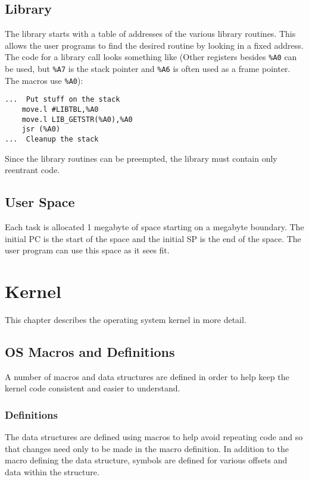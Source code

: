 \documentclass[10pt, openany]{book}
\begin{document}
\section{Library}
The library starts with a table of addresses of the various library routines.  This allows the user programs to find the desired routine by looking in a fixed address.  The code for a library call looks something like (Other registers besides \verb|%A0| can be used, but \verb|%A7| is the stack pointer and \verb|%A6| is often used as a frame pointer.  The macros use \verb|%A0|):
\begin{lstlisting}
...  Put stuff on the stack
    move.l #LIBTBL,%A0
    move.l LIB_GETSTR(%A0),%A0
    jsr (%A0)
...  Cleanup the stack
\end{lstlisting}

Since the library routines can be preempted, the library must contain only reentrant code.

\section{User Space}
Each task is allocated 1 megabyte of space starting on a megabyte boundary.  The initial PC is the start of the space and the initial SP is the end of the space.  The user program can use this space as it sees fit.

\chapter{Kernel}
This chapter describes the operating system kernel in more detail.
\section{OS Macros and Definitions}
A number of macros and data structures are defined in order to help keep the kernel code consistent and easier to understand.

\subsection{Definitions}
The data structures are defined using macros to help avoid repeating code and so that changes need only to be made in the macro definition.  In addition to the macro defining the data structure, symbols are defined for various offsets and data within the structure.
\end{document}
